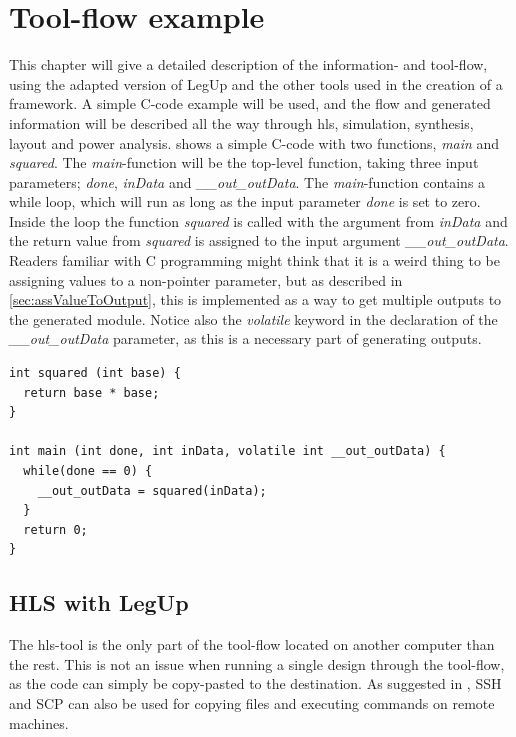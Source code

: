 \chapter{\label{chp:toolflowex}Tool-flow example}
This chapter will give a detailed description of the information- and tool-flow, using the adapted version of LegUp and the other tools used in the creation of a framework. A simple C-code example will be used, and the flow and generated information will be described all the way through \gls{hls}, simulation, synthesis, layout and power analysis.  shows a simple C-code with two functions, \textit{main} and \textit{squared}. The \textit{main}-function will be the top-level function, taking three input parameters; \textit{done}, \textit{inData} and \textit{\_\_out\_outData}. The \textit{main}-function contains a while loop, which will run as long as the input parameter \textit{done} is set to zero. Inside the loop the function \textit{squared} is called with the argument from \textit{inData} and the return value from \textit{squared} is assigned to the input argument \textit{\_\_out\_outData}. Readers familiar with C programming might think that it is a weird thing to be assigning values to a non-pointer parameter, but as described in \cref{sec:assValueToOutput}, this is implemented as a way to get multiple outputs to the generated module. Notice also the \textit{volatile} keyword in the declaration of the \textit{\_\_out\_outData} parameter, as this is a necessary part of generating outputs.
\lstset{language=C++,style=Cstyle}
\begin{lstlisting}[caption={Simple C-code example},label=lst:ccodelisting]
int squared (int base) {
  return base * base;
}

int main (int done, int inData, volatile int __out_outData) {
  while(done == 0) {
    __out_outData = squared(inData);
  }
  return 0;
}
\end{lstlisting}

\section{HLS with LegUp}
The \gls{hls}-tool is the only part of the tool-flow located on another computer than the rest. This is not an issue when running a single design through the tool-flow, as the code can simply be copy-pasted to the destination. As suggested in \cite{holm2015pro}, SSH and SCP can also be used for copying files and executing commands on remote machines.
